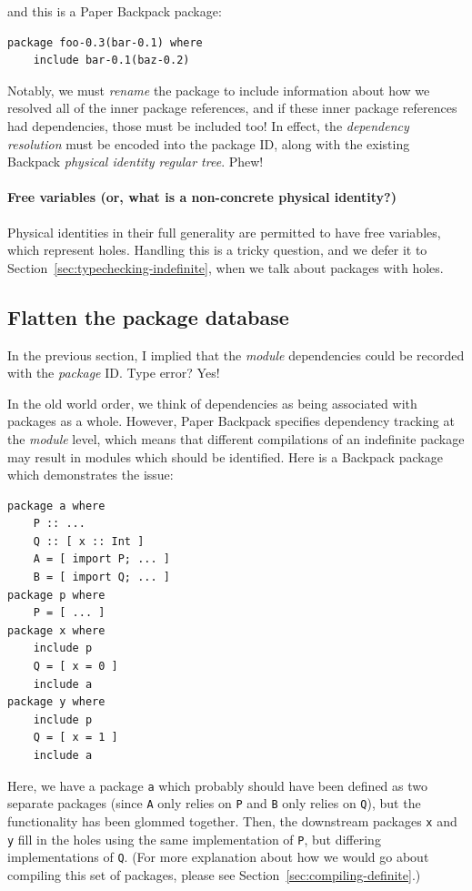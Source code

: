 \documentclass{article}
\begin{document}
and this is a Paper Backpack package:

\begin{verbatim}
package foo-0.3(bar-0.1) where
    include bar-0.1(baz-0.2)
\end{verbatim}

Notably, we must \emph{rename} the package to include information about
how we resolved all of the inner package references, and if these inner
package references had dependencies, those must be included too!  In
effect, the \emph{dependency resolution} must be encoded into the package ID,
along with the existing Backpack \emph{physical identity regular tree}.
Phew!

\paragraph{Free variables (or, what is a non-concrete physical
identity?)} Physical identities in their full generality are permitted
to have free variables, which represent holes.  Handling this is a
tricky question, and we defer it to Section~\ref{sec:typechecking-indefinite}, when
we talk about packages with holes.

\subsection{Flatten the package database}\label{sec:flatten}

In the previous section, I implied that the \emph{module} dependencies
could be recorded with the \emph{package} ID\@.  Type error? Yes!

In the old world order, we think of dependencies as being associated with
packages as a whole.  However, Paper Backpack specifies dependency tracking
at the \emph{module} level, which means that different compilations of
an indefinite package may result in modules which should be identified.
Here is a Backpack package which demonstrates the issue:

\begin{verbatim}
package a where
    P :: ...
    Q :: [ x :: Int ]
    A = [ import P; ... ]
    B = [ import Q; ... ]
package p where
    P = [ ... ]
package x where
    include p
    Q = [ x = 0 ]
    include a
package y where
    include p
    Q = [ x = 1 ]
    include a
\end{verbatim}

Here, we have a package \verb|a| which probably should have been defined as
two separate packages (since \verb|A| only relies on \verb|P| and \verb|B|
only relies on \verb|Q|), but the functionality has been glommed together.
Then, the downstream packages \verb|x| and \verb|y| fill in the holes using the
same implementation of \verb|P|, but differing implementations of \verb|Q|.
(For more explanation about how we would go about compiling this set of
packages, please see Section~\ref{sec:compiling-definite}.)
\end{document}
